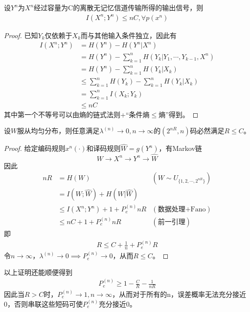 \documentclass{ctexbook}
\begin{document}
\begin{lemma}
    设$Y^n$为$X^n$经过容量为C的离散无记忆信道传输所得的输出信号，则\begin{align*}
        I(X^n;Y^n)\leq nC,\forall p(x^n)
    \end{align*}
\end{lemma}
\begin{proof}
    已知$Y_k$仅依赖于$X_k$而与其他输入条件独立，因此有\begin{align*}
        I(X^n;Y^n)&=H(Y^n)-H(Y^n|X^n)\\
        &=H(Y^n)-\sum_{k=1}^n H(Y_k|Y_1,\cdots,Y_{k-1},X^n)\\
        &=H(Y^n)-\sum_{k=1}^n H(Y_k|X_k)\\
        &\leq \sum_{k=1}^n H(Y_k)-\sum_{k=1}^n H(Y_k|X_k)\\
        &=\sum_{k=1}^n I(X_k;Y_k)\\
        &\leq nC
    \end{align*}
    其中第一个不等号可以由熵的链式法则+“条件熵$\leq$熵”得到。
\end{proof}

\begin{theorem}[信道编码定理的弱逆定理]
    设$W$服从均匀分布，则任意满足$\lambda^{(n)}\to 0,n\to\infty$的$(2^{nR},n)$码必然满足$R\leq C$。
\end{theorem}
\begin{proof}
    给定编码规则$x^n(\cdot)$和译码规则$\hat{W}=g(Y^n)$，有Markov链$$W\to X^n\to Y^n\to \hat{W}$$
    因此\begin{align*}
        nR&=H(W)&(W\sim U_{\{1,2,\cdots,2^{nR}\}})\\
        &= I(W;\hat{W})+H(W|\hat{W})\\
        &\leq I(X^n;Y^n)+1+P_e^{(n)} nR&(\text{数据处理+Fano})\\
        &\leq nC+1+P_e^{(n)} nR&(\text{前一引理})
    \end{align*}
    即\begin{align*}
        R\leq C+\frac{1}{n}+P_e^{(n)} R
    \end{align*}
    令$n\to\infty$，$\lambda^{(n)}\to 0\implies P_e^{(n)}\to 0$，从而$R\leq C$。
\end{proof}

以上证明还能顺便得到\begin{align*}
        P_e^{(n)}\geq 1-\frac{C}{R}-\frac{1}{nR}
    \end{align*}
因此当$R>C$时，$P_e^{(n)}\to 1,n\to\infty$，从而对于所有的n，误差概率无法充分接近0，否则串联这些短码可使$P_e^{(n)}$充分接近0。
\end{document}
